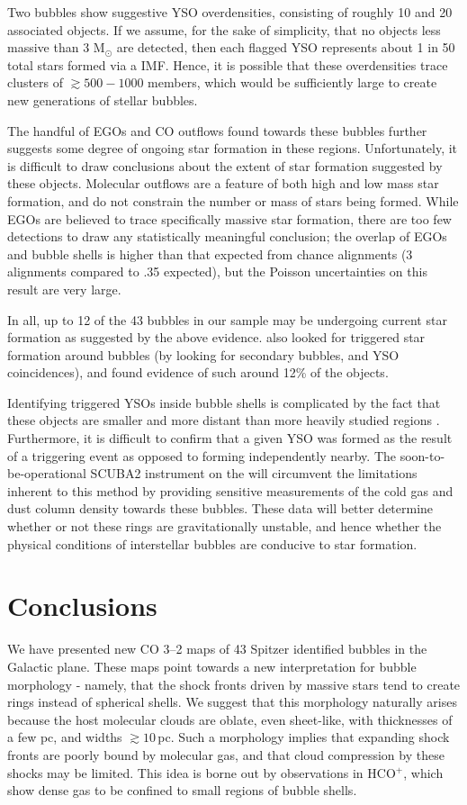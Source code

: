 Two bubbles show suggestive YSO overdensities, consisting of roughly 10 and 20 associated objects.
If we assume, for the sake of simplicity, that no objects less massive than 3 M$_\odot$ are detected, then each
flagged YSO represents about 1 in 50 total stars formed via a  IMF.
Hence, it is possible that these overdensities trace clusters of $\gtrsim 500-1000$ members,
which would be sufficiently large to create new generations of stellar bubbles.

The handful of EGOs and CO outflows found towards these bubbles further suggests some degree
of ongoing star formation in these regions. Unfortunately, it is difficult to draw conclusions
about the extent of star formation suggested by these objects. Molecular outflows are a feature of both
high and low mass star formation, and do not constrain the number or mass of stars being formed.
While EGOs are believed to trace specifically massive star formation, there are too
few detections to draw any statistically meaningful conclusion; the overlap of EGOs and
bubble shells is higher than that expected from chance alignments (3 alignments compared to .35 expected),
but the Poisson uncertainties on this result are very large.

In all, up to 12 of the 43 bubbles in our sample may be undergoing current star formation
as suggested by the above evidence.  also looked for triggered star formation
around bubbles (by looking for secondary bubbles, and YSO coincidences),
and found evidence of such around 12\% of the objects.

Identifying triggered YSOs inside bubble shells is complicated by the fact
that these objects are smaller and more distant than more heavily studied regions
\citep{Koenig08, Povich09}. Furthermore, it is difficult to confirm that a given
YSO was formed as the result of a triggering event as opposed to forming independently nearby.
The soon-to-be-operational SCUBA2
instrument on the \jcmt will circumvent the limitations inherent to this method by providing sensitive
measurements of the cold gas and dust column density towards these bubbles. These data will better determine
whether or not these rings are gravitationally unstable, and hence whether the physical
conditions of interstellar bubbles are conducive to star formation.

\section{Conclusions}
\label{sec:conclusion_ch2_bubbles}
We have presented new CO 3--2 maps of 43 Spitzer identified
bubbles in the Galactic plane.  These maps point towards a new
interpretation for bubble morphology - namely, that the shock fronts
driven by massive stars tend to create rings instead of
spherical shells. We suggest that this morphology naturally arises
because the host molecular clouds are oblate, even sheet-like, with thicknesses of a few pc, and
widths $\gtrsim10$\,pc.
Such a morphology implies that expanding shock fronts are poorly bound by
molecular gas, and that cloud compression by these shocks may be limited. This
idea is borne out by observations in HCO$^+$, which show dense gas to be confined to
small regions of bubble shells.

